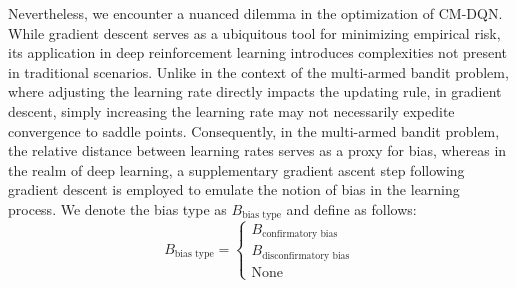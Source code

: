 \documentclass[10pt,letterpaper]{article}
\begin{document}
Nevertheless, we encounter a nuanced dilemma in the optimization of CM-DQN. While gradient descent serves as a ubiquitous tool for minimizing empirical risk, its application in deep reinforcement learning introduces complexities not present in traditional scenarios. Unlike in the context of the multi-armed bandit problem, where adjusting the learning rate directly impacts the updating rule, in gradient descent, simply increasing the learning rate may not necessarily expedite convergence to saddle points. Consequently, in the multi-armed bandit problem, the relative distance between learning rates serves as a proxy for bias, whereas in the realm of deep learning, a supplementary gradient ascent step following gradient descent is employed to emulate the notion of bias in the learning process. We denote the bias type as $B_{\text{bias type}}$ and define as follows:
\begin{equation*}
    B_{\text{bias type}} = \begin{cases}
        B_{\text{confirmatory bias}} \\
        B_{\text{disconfirmatory bias}}  \\
        \text{None}
    \end{cases}
\end{equation*}
\end{document}
